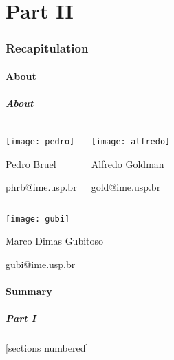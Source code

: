 \documentclass[10pt, compress]{beamer}
\begin{document}
\part{Part II}

\maketitle

\section{Recapitulation}

\subsection{About}

\begin{frame}
    \frametitle{About}
    \footnotesize
    \begin{columns}[T,onlytextwidth]
        \begin{center}
            \texttt{[image: pedro]}

            Pedro Bruel

            \alert{phrb}@ime.usp.br
        \end{center}

        \begin{center}
            \texttt{[image: alfredo]}

            Alfredo Goldman

            \alert{gold}@ime.usp.br
        \end{center}

    \end{columns}

    \begin{center}
        \texttt{[image: gubi]}

        Marco Dimas Gubitoso

        \alert{gubi}@ime.usp.br
    \end{center}
\end{frame}

\subsection{Summary}

\begin{frame}
    \frametitle{Part I}
    [sections numbered]
    \tableofcontents[hideallsubsections, part=1]
\end{frame}
\end{document}

